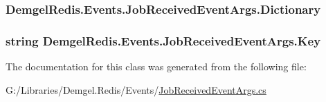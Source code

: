 \subsubsection[{Dictionary}]{ Demgel\+Redis.\+Events.\+Job\+Received\+Event\+Args.\+Dictionary\hspace{0.3cm}{\ttfamily [get]}}\label{class_demgel_redis_1_1_events_1_1_job_received_event_args_acc997ff6fa65e0a3dab49731530d619c}
\hypertarget{class_demgel_redis_1_1_events_1_1_job_received_event_args_a180aea264d16ff9fbba4fa640ac5c460}{}
\subsubsection[{Key}]{\setlength{\rightskip}{0pt plus 5cm}string Demgel\+Redis.\+Events.\+Job\+Received\+Event\+Args.\+Key\hspace{0.3cm}{\ttfamily [get]}}\label{class_demgel_redis_1_1_events_1_1_job_received_event_args_a180aea264d16ff9fbba4fa640ac5c460}


The documentation for this class was generated from the following file\+:\begin{DoxyCompactItemize}
\item 
G\+:/\+Libraries/\+Demgel.\+Redis/\+Events/\hyperlink{_job_received_event_args_8cs}{Job\+Received\+Event\+Args.\+cs}\end{DoxyCompactItemize}

